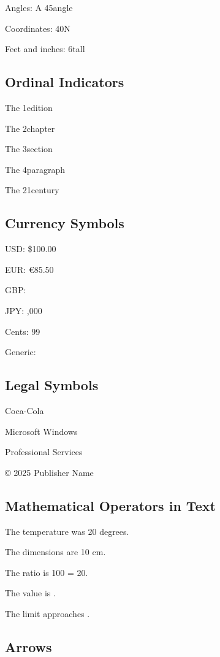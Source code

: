 \documentclass[11pt]{article}
\begin{document}
Angles: A 45\degrees angle

Coordinates: 40\dblprimetext N

Feet and inches: 6\dblprimetext tall

\subsection{Ordinal Indicators}

The 1\ordst edition

The 2\ordnd chapter

The 3\ordrd section  

The 4\ordth paragraph

The 21\ordst century

\subsection{Currency Symbols}

USD: \$100.00

EUR: \euro 85.50

GBP: 

JPY: ,000

Cents: 99\cent

Generic: 

\subsection{Legal Symbols}

Coca-Cola\registered

Microsoft Windows\trademark

Professional Services\servicemark

\copyright{} 2025 Publisher Name

\subsection{Mathematical Operators in Text}

The temperature was 20 degrees.

The dimensions are 10 cm.

The ratio is 100 = 20.

The value is .

The limit approaches \textinfty.

\subsection{Arrows}
\end{document}
